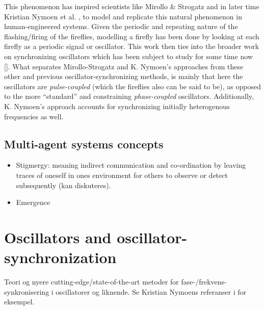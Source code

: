This phenomenon has inspired scientists like Mirollo \& Strogatz \cite{mirollo_strogatz_PCO_synch} and in later time Kristian Nymoen et al. \cite{nymoen_synch}, to model and replicate this natural phenomenon in human-engineered systems. Given the periodic and repeating nature of the flashing/firing of the fireflies, modelling a firefly has been done by looking at each firefly as a periodic signal or oscillator. This work \cite{mirollo_strogatz_PCO_synch, nymoen_synch} then ties into the broader work on synchronizing oscillators which has been subject to study for some time now []. What separates Mirollo-Strogatz and K. Nymoen's approaches from these other and previous oscillator-synchronizing methods, is mainly that here the oscillators are \textit{pulse-coupled} (which the fireflies also can be said to be), as opposed to the more ``standard'' and constraining \textit{phase-coupled} oscillators. Additionally, K. Nymoen's approach accounts for synchronizing initially heterogenous frequencies as well.

	\subsection{Multi-agent systems concepts}
	
	\begin{itemize}
		\item Stigmergy: meaning indirect communication and co-ordination by leaving traces of oneself in ones environment for others to observe or detect subsequently (kan diskuteres).
		\item Emergence
	\end{itemize}







\section{Oscillators and oscillator-synchronization}

	
	
	Teori og nyere cutting-edge/state-of-the-art metoder for fase-/frekvens-synkronisering i oscillatorer og liknende. Se Kristian Nymoens referanser i \cite{nymoen_synch} for eksempel. \nl
	
